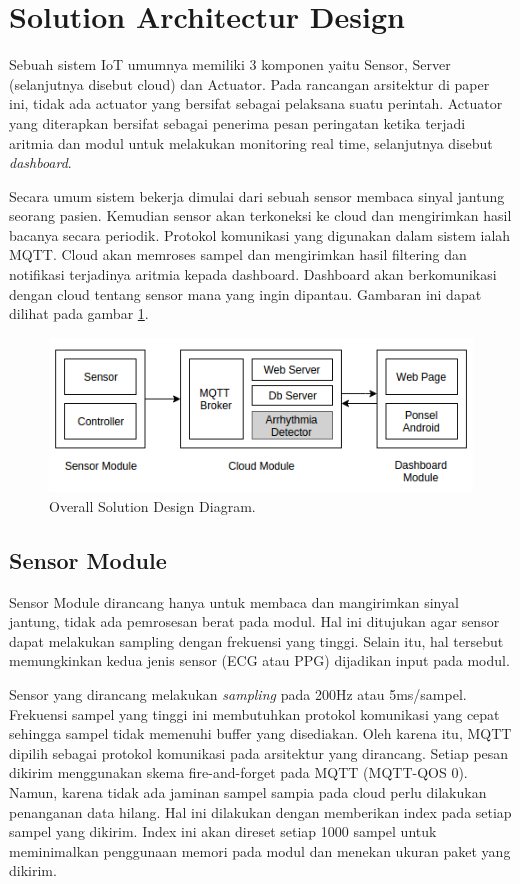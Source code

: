 \documentclass[conference]{IEEEtran}
\begin{document}
\section{Solution Architectur Design}
Sebuah sistem IoT umumnya memiliki 3 komponen yaitu Sensor, Server (selanjutnya disebut cloud) dan Actuator. Pada rancangan arsitektur di paper ini, tidak ada actuator yang bersifat sebagai pelaksana suatu perintah. Actuator yang diterapkan bersifat sebagai penerima pesan peringatan ketika terjadi aritmia dan modul untuk melakukan monitoring real time, selanjutnya disebut \textit{dashboard}.

Secara umum sistem bekerja dimulai dari sebuah sensor membaca sinyal jantung seorang pasien. Kemudian sensor akan terkoneksi ke cloud dan mengirimkan hasil bacanya secara periodik. Protokol komunikasi yang digunakan dalam sistem ialah MQTT. Cloud akan memroses sampel dan mengirimkan hasil filtering dan notifikasi terjadinya aritmia kepada dashboard. Dashboard akan berkomunikasi dengan cloud tentang sensor mana yang ingin dipantau. Gambaran ini dapat dilihat pada gambar \ref{fig:overall_diagram}.

\begin{figure}[htbp]
\centerline{\includegraphics[scale=0.5]{images/overall.png}}
\caption{Overall Solution Design Diagram.}
\label{fig:overall_diagram}
\end{figure}

\subsection{Sensor Module}
Sensor Module dirancang hanya untuk membaca dan mangirimkan sinyal jantung, tidak ada pemrosesan berat pada modul. Hal ini ditujukan agar sensor dapat melakukan sampling dengan frekuensi yang tinggi. Selain itu, hal tersebut memungkinkan kedua jenis sensor (ECG atau PPG) dijadikan input pada modul. 

Sensor yang dirancang melakukan \textit{sampling} pada 200Hz atau 5ms/sampel. Frekuensi sampel yang tinggi ini membutuhkan protokol komunikasi yang cepat sehingga sampel tidak memenuhi buffer yang disediakan. Oleh karena itu, MQTT dipilih sebagai protokol komunikasi pada arsitektur yang dirancang. Setiap pesan dikirim menggunakan skema fire-and-forget pada MQTT (MQTT-QOS 0). Namun, karena tidak ada jaminan sampel sampia pada cloud perlu dilakukan penanganan data hilang. Hal ini dilakukan dengan memberikan index pada setiap sampel yang dikirim. Index ini akan direset setiap 1000 sampel untuk meminimalkan penggunaan memori pada modul dan menekan ukuran paket yang dikirim.
\end{document}

